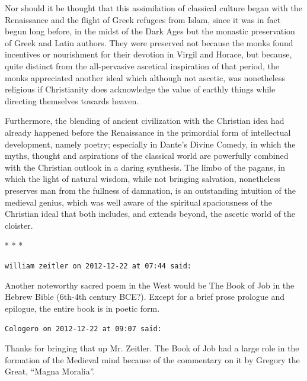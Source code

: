 Nor should it be thought that this assimilation of classical culture began with the Renaissance and the flight of Greek refugees from Islam, since it was in fact begun long before, in the midst of the Dark Ages but the monastic preservation of Greek and Latin authors. They were preserved not because the monks found incentives or nourishment for their devotion in Virgil and Horace, but because, quite distinct from the all-pervasive ascetical inspiration of that period, the monks appreciated another ideal which although not ascetic, was nonetheless religious if Christianity does acknowledge the value of earthly things while directing themselves towards heaven.

Furthermore, the blending of ancient civilization with the Christian idea had already happened before the Renaissance in the primordial form of intellectual development, namely poetry; especially in Dante's Divine Comedy, in which the myths, thought and aspirations of the classical world are powerfully combined with the Christian outlook in a daring synthesis. The limbo of the pagans, in which the light of natural wisdom, while not bringing salvation, nonetheless preserves man from the fullness of damnation, is an outstanding intuition of the medieval genius, which was well aware of the spiritual spaciousness of the Christian ideal that both includes, and extends beyond, the ascetic world of the cloister.



\begin{center}* * *\end{center}

\begin{footnotesize}
\begin{sffamily}
\texttt{william zeitler on 2012-12-22 at 07:44 said:}

Another noteworthy sacred poem in the West would be The Book of Job in the Hebrew Bible (6th-4th century BCE?). Except for a brief prose prologue and epilogue, the entire book is in poetic form.

\hfill

\texttt{Cologero on 2012-12-22 at 09:07 said:}

Thanks for bringing that up Mr. Zeitler. The Book of Job had a large role in the formation of the Medieval mind because of the commentary on it by Gregory the Great, ``Magna Moralia''.


\hfill

\end{sffamily}
\end{footnotesize}

